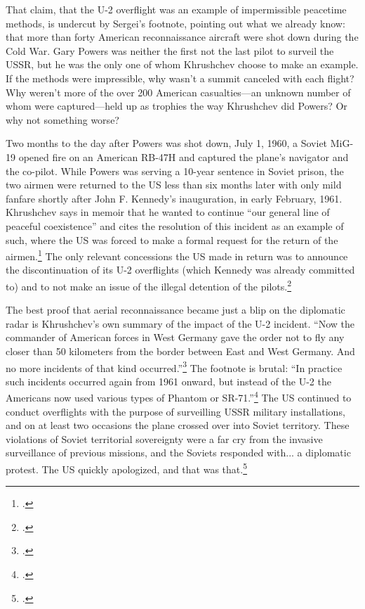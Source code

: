 \documentclass{report}
\begin{document}
\begin{refsegment}
That claim, that the U-2 overflight was an example of impermissible peacetime methods, is undercut by Sergei's footnote, pointing out what we already know: that more than forty American reconnaissance aircraft were shot down during the Cold War. Gary Powers was neither the first not the last pilot to surveil the USSR, but he was the only one of whom Khrushchev choose to make an example. If the methods were impressible, why wasn't a summit canceled with each flight?  Why weren't more of the over 200 American casualties---an unknown number of whom were captured---held up as trophies the way Khrushchev did Powers? Or why not something worse?

Two months to the day after Powers was shot down, July 1, 1960, a Soviet MiG-19 opened fire on an American RB-47H and captured the plane's navigator and the co-pilot. While Powers was serving a 10-year sentence in Soviet prison, the two airmen were returned to the US less than six months later with only mild fanfare shortly after John F. Kennedy's inauguration, in early February, 1961. Khrushchev says in memoir that he wanted to continue ``our general line of peaceful coexistence'' and cites the resolution of this incident as an example of such, where the US was forced to make a formal request for the return of the airmen.\footcite[p.~256-257]{khrushchev_memoirs_2007} The only relevant concessions the US made in return was to announce the discontinuation of its U-2 overflights (which Kennedy was already committed to) and to not make an issue of the illegal detention of the pilots.\footcite{time_cold_1961}

The best proof that aerial reconnaissance became just a blip on the diplomatic radar is Khrushchev's own summary of the impact of the U-2 incident. ``Now the commander of American forces in West Germany gave the order not to fly any closer than 50 kilometers from the border between East and West Germany. And no more incidents of that kind occurred.''\footcite[p.~256]{khrushchev_memoirs_2007} The footnote is brutal: ``In practice such incidents occurred again from 1961 onward, but instead of the U-2 the Americans now used various types of Phantom or SR-71.''\footcite[p.~258]{khrushchev_memoirs_2007} The US continued to conduct overflights with the purpose of surveilling USSR military installations, and on at least two occasions the plane crossed over into Soviet territory. These violations of Soviet territorial sovereignty were a far cry from the invasive surveillance of previous missions, and the Soviets responded with... a diplomatic protest. The US quickly apologized, and that was that.\footcite{orlov_u-2_2007}


\end{refsegment}
\end{document}
